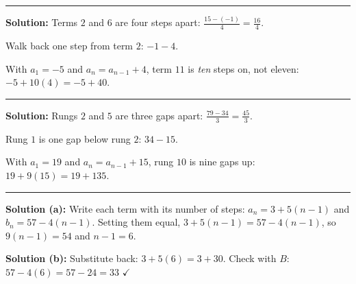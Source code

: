 \documentclass[12pt]{article}
\begin{document}
\vspace{0.2cm}\noindent\rule{\linewidth}{0.2pt}


\textbf{Solution:} Terms $2$ and $6$ are four steps apart: $\frac{15 - (-1)}{4} = \frac{16}{4}$. 

Walk back one step from term $2$: $-1 - 4$. 

With $a_1 = -5$ and $a_n = a_{n-1} + 4$, term $11$ is \emph{ten} steps on, not eleven: $-5 + 10(4) = -5 + 40$. 

\vspace{0.2cm}\noindent\rule{\linewidth}{0.2pt}


\textbf{Solution:} Rungs $2$ and $5$ are three gaps apart: $\frac{79 - 34}{3} = \frac{45}{3}$. 

Rung $1$ is one gap below rung $2$: $34 - 15$. 

With $a_1 = 19$ and $a_n = a_{n-1} + 15$, rung $10$ is nine gaps up: $19 + 9(15) = 19 + 135$. 

\vspace{0.2cm}\noindent\rule{\linewidth}{0.2pt}


\textbf{Solution (a):} Write each term with its number of steps: $a_n = 3 + 5(n-1)$ and $b_n = 57 - 4(n-1)$. Setting them equal, $3 + 5(n-1) = 57 - 4(n-1)$, so $9(n-1) = 54$ and $n - 1 = 6$. 

\textbf{Solution (b):} Substitute back: $3 + 5(6) = 3 + 30$. Check with $B$: $57 - 4(6) = 57 - 24 = 33$ $\checkmark$ 
\end{document}
